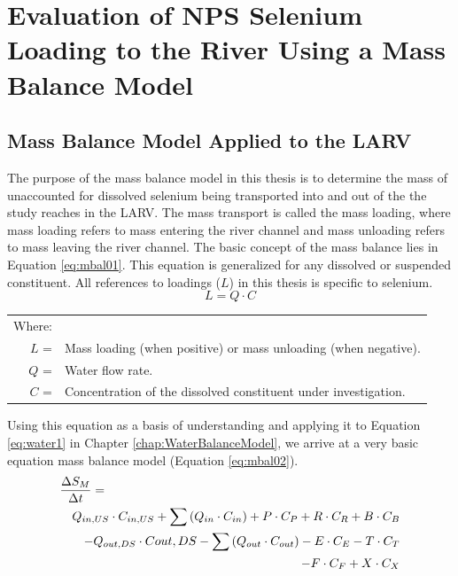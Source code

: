 \chapter{Evaluation of NPS Selenium Loading to the River Using a Mass Balance Model}
\label{chap:MassBalanceModel}

\section{Mass Balance Model Applied to the LARV}
\label{sec:AppliedMassModel}

The purpose of the mass balance model in this thesis is to determine the mass of unaccounted for dissolved selenium being transported into and out of the the study reaches in the LARV.  The mass transport is called the mass loading, where mass loading refers to mass entering the river channel and mass unloading refers to mass leaving the river channel.  The basic concept of the mass balance lies in Equation \ref{eq:mbal01}.  This equation is generalized for any dissolved or suspended constituent.  All references to loadings ($ L $) in this thesis is specific to selenium.
\begin{equation}
	\label{eq:mbal01}
	L=Q \cdot C
\end{equation}
\begin{tabular}{r p{5.5in}}
		Where:  \\
		$ L $ = & Mass loading (when positive) or mass unloading (when negative).\\
		$ Q $ = & Water flow rate.\\
		$ C $ = & Concentration of the dissolved constituent under investigation.\\
\end{tabular}

Using this equation as a basis of understanding and applying it to Equation \ref{eq:water1} in Chapter \ref{chap:WaterBalanceModel}, we arrive at a very basic equation mass balance model (Equation \ref{eq:mbal02}).
\begin{eqnarray}
	\label{eq:mbal02}
	\lefteqn{\frac{\Delta S_M}{\Delta t}=} \\
	\nonumber & &  Q_{in,US} \cdot C_{in,US} + \sum \left( Q_{in} \cdot C_{in} \right) + P \cdot C_P + R \cdot C_R  + B \cdot C_B\\
	\nonumber & & - Q_{out,DS} \cdot C{out,DS} - \sum \left( Q_{out} \cdot C_{out} \right) - E \cdot C_E - T \cdot C_T \\
	\nonumber & & - F \cdot C_F + X \cdot C_X
\end{eqnarray}

